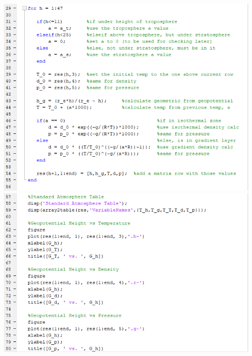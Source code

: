 \documentclass{article}
\begin{document}
\includegraphics [width=\linewidth]{code2.png}\\
\includegraphics [width=\linewidth]{code3.png}

\newpage
\end{document}
